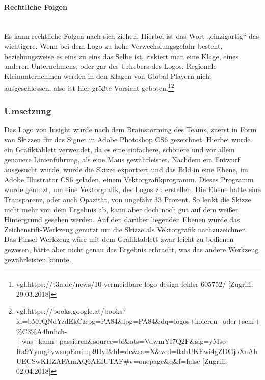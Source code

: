 \paragraph{Rechtliche Folgen}
\leavevmode \\
Es kann rechtliche Folgen nach sich ziehen. Hierbei ist das Wort „einzigartig“ das wichtigere. Wenn bei dem Logo zu hohe Verwechslungsgefahr besteht, beziehungsweise es eins zu eins das Selbe ist, riskiert man eine Klage, eines anderen Unternehmens, oder gar des Urhebers des Logos. Regionale Kleinunternehmen werden in den Klagen von Global Playern nicht ausgeschlossen, also ist hier größte Vorsicht geboten.\footnote{\label{} vgl.https://t3n.de/news/10-vermeidbare-logo-design-fehler-605752/ [Zugriff: 29.03.2018]}\footnote{\label{} vgl.https://books.google.at/books?id=bM0QNdYzdEkC\&pg=PA84\&lpg=PA84\&dq=logos+koieren+oder+sehr+\%C3\%A4hnlich-+was+kann+passieren\&source=bl\&ots=VdwmYI7Q2F\&sig=yMso-Ra9Yymg1ywsopEmimp9HyI\&hl=de\&sa=X\&ved=0ahUKEwi4gZDGjoXaAhUECSwKHZAFAmAQ6AEIUTAF\#v=onepage\&q\&f=false [Zugriff: 02.04.2018]}

\subsubsection{Umsetzung}
Das Logo von Insight wurde nach dem Brainstorming des Teams, zuerst in Form von Skizzen für das Signet in Adobe Photoshop CS6 gezeichnet. Hierbei wurde ein Grafiktablett verwendet, da es eine einfachere, schönere und vor allem genauere Linienführung, als eine Maus gewährleistet.
Nachdem ein Entwurf ausgesucht wurde, wurde die Skizze exportiert und das Bild in eine Ebene, im Adobe Illustrator CS6 geladen, einem Vektorgrafikprogramm. Dieses Programm wurde genutzt, um eine Vektorgrafik, des Logos zu erstellen. Die Ebene hatte eine Transparenz, oder auch Opazität, von ungefähr 33 Prozent. So lenkt die Skizze nicht mehr von dem Ergebnis ab, kann aber doch noch gut auf dem weißen Hintergrund gesehen werden. Auf den darüber liegenden Ebenen wurde das Zeichenstift-Werkzeug genutzt um die Skizze als Vektorgrafik nachzuzeichnen. Das Pinsel-Werkzeug wäre mit dem Grafiktablett zwar leicht zu bedienen gewesen, hätte aber nicht genau das Ergebnis erbracht, was das andere Werkzeug gewährleisten konnte.
\leavevmode \\

